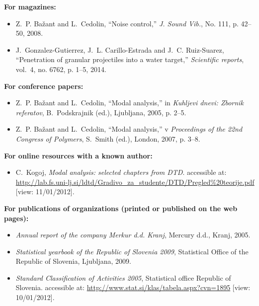 \textbf{For magazines:}
\begin{itemize}
\item[{[5]}] Z.~P. Ba\v{z}ant and L.~Cedolin, ``Noise control,'' \emph{J.
Sound
Vib.}, No. 111, p. 42--50, 2008.\\
\item[{[6]}] J.~Gonzalez-Gutierrez, J.~L. Carillo-Estrada and J.~C.
Ruiz-Suarez,
``Penetration of granular projectiles into a water target,''
\emph{Scientific
reports}, vol.~4, no. 6762, p. 1--5, 2014.
\end{itemize}

\textbf{For conference papers:}
\begin{itemize}
\item[{[7]}] Z.~P. Ba\v{z}ant and L.~Cedolin, ``Modal analysis,'' in
\emph{Kuhljevi dnevi: Zbornik referatov}, B.~Podskrajnik (ed.), Ljubljana,
2005, p. 2--5.\\

\item[{[8]}] Z.~P. Ba\v{z}ant and L.~Cedolin, ``Modal analysis,'' v
\emph{Proceedings of the 22nd Congress of Polymers}, S.~Smith (ed.), London,
2007, p. 3--8.\\
\end{itemize}

\textbf{For online resources with a known author:}
\begin{itemize}
\item[{[9]}]C.~Kogoj, \emph{Modal analysis: selected chapters from {DTD}}.
accessible at:
\url{http://lab.fs.uni-lj.si/ldtd/Gradivo_za_studente/DTD/Pregled\%20teorije.pdf}
[view: 11/01/2012].
\end{itemize}

\textbf{For publications of organizations (printed or published on the web
pages):}
\begin{itemize}
\item[{[10]}] \emph{Annual report of the company {M}erkur d.d. {K}ranj}, {Mercury
d.d., Kranj}, 2005.\\

\item[{[11]}] \emph{{Statistical yearbook of the Republic of Slovenia 2009}},
Statistical Office of the Republic of Slovenia, Ljubljana, 2009.\\

\item[{[12]}]\emph{Standard Classification of Activities 2005}, {Statistical
office
Republic of Slovenia}. accessible at:
\url{http://www.stat.si/klas/tabela.aspx?cvn=1895}
[view: 10/01/2012].
\end{itemize}

